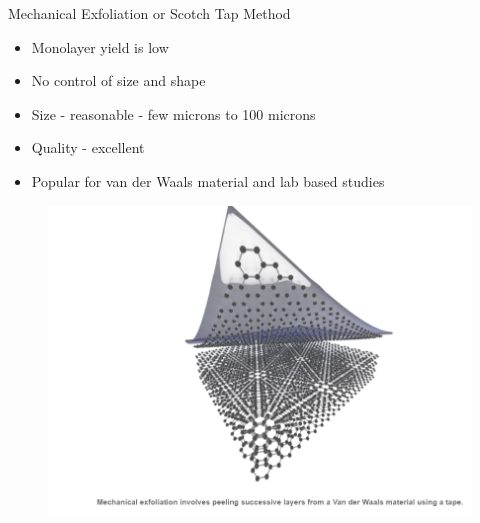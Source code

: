 \documentclass{beamer}
\begin{document}
\begin{frame}{Mechanical Exfoliation or Scotch Tap Method}
    \begin{itemize}
        \item Monolayer yield is low
        \item No control of size and shape
        \item Size - reasonable - few microns to 100 microns
        \item Quality - excellent
        \item Popular for van der Waals material and lab based studies
    \end{itemize}
    \begin{figure}
        \centering
        \includegraphics[scale = 0.4]{mechanical_exfoliation.PNG}
    \end{figure}
\end{frame}
\end{document}
